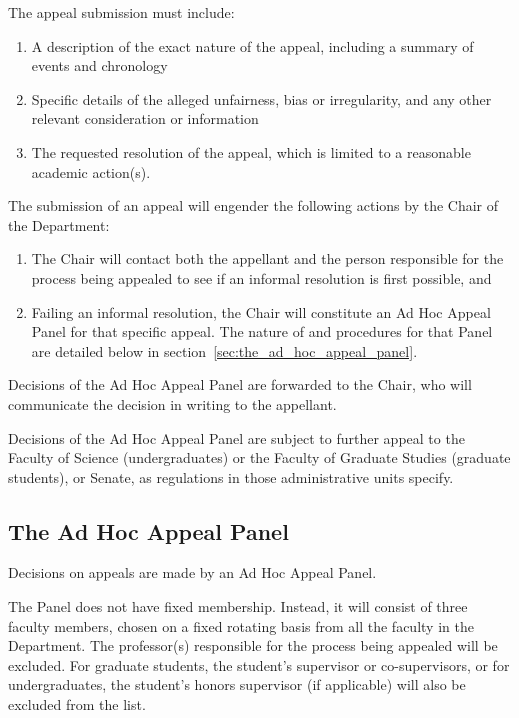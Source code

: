 \p The appeal submission must include:
\begin{enumerate}

\item A description of the exact nature of the appeal, including a summary of
    events and chronology

\item Specific details of the alleged unfairness, bias or irregularity, and any
    other relevant consideration or information

\item The requested resolution of the appeal, which is limited to a reasonable
    academic action(s). 

\end{enumerate}

\p The submission of an appeal will engender the following actions by
the Chair of the Department:

\begin{enumerate}

\item The Chair will contact both the appellant and the person responsible for
the process being appealed to see if an informal resolution is first possible, and

\item Failing an informal resolution, the Chair will constitute an Ad Hoc
Appeal Panel for that specific appeal.  The nature of and procedures for that
Panel are detailed below in section~\ref{sec:the_ad_hoc_appeal_panel}.

\end{enumerate}

\p Decisions of the Ad Hoc Appeal Panel are forwarded to the Chair, who
will communicate the decision in writing to the appellant.

\p Decisions of the Ad Hoc Appeal Panel are subject to further appeal to
the Faculty of Science (undergraduates) or the Faculty of Graduate Studies
(graduate students), or Senate, as regulations in those administrative units
specify. 


\subsection{\label{sec:the_ad_hoc_appeal_panel}The Ad Hoc Appeal Panel}

\cp

\p Decisions on appeals are made by an Ad Hoc Appeal Panel.

\p The Panel does not have fixed membership.  Instead, it will consist
of three faculty members, chosen on a fixed rotating basis from all the faculty
in the Department.  The professor(s) responsible for the process being appealed
will be excluded.  For graduate students, the student's supervisor or
co-supervisors, or for undergraduates, the student's honors supervisor (if
applicable) will also be excluded from the list.

